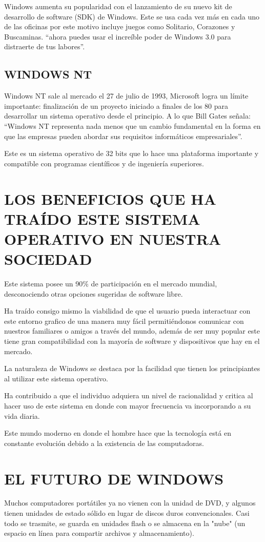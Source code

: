 Windows aumenta su popularidad con el lanzamiento de su nuevo kit de desarrollo de software (SDK) de Windows. Este se usa cada vez más en cada uno de las oficinas por este 
motivo incluye juegos como Solitario, Corazones y Buscaminas. “ahora puedes usar el increíble poder de Windows 3.0 para distraerte de tus labores”.

\subsection*{WINDOWS NT}
Windows NT sale al mercado el 27 de julio de 1993, Microsoft logra un límite importante: finalización de un proyecto iniciado a finales de los 80 para desarrollar un 
sistema operativo desde el principio. A lo que Bill Gates señala: “Windows NT representa nada menos que un cambio fundamental en la forma en que las empresas pueden abordar 
sus requisitos informáticos empresariales”.
 
Este es un sistema operativo de 32 bits que lo hace una plataforma importante y compatible con programas científicos y de ingeniería superiores.

\section*{LOS BENEFICIOS QUE HA TRAÍDO ESTE SISTEMA OPERATIVO EN NUESTRA SOCIEDAD}
Este sistema posee un 90\% de participación en el mercado mundial, desconociendo otras opciones sugeridas de software libre.

Ha traído consigo mismo la viabilidad de que el  usuario pueda interactuar con este entorno grafico de una manera muy fácil  permitiéndonos comunicar con nuestros 
familiares o amigos a través del mundo, además de ser muy popular este tiene gran compatibilidad con la mayoría de  software y dispositivos que hay en el mercado.

La naturaleza de Windows  se destaca por la facilidad que tienen los principiantes al utilizar este sistema operativo.

Ha contribuido a que el individuo adquiera un nivel de racionalidad y critica al hacer uso de este sistema en donde con mayor frecuencia va incorporando a su vida diaria.

Este mundo moderno en donde el hombre hace que la tecnología está en constante evolución debido a la existencia de las computadoras.

\section*{EL FUTURO DE WINDOWS}
Muchos computadores portátiles ya no vienen con la unidad de DVD, y algunos tienen unidades de estado sólido en lugar de discos duros convencionales. Casi todo se trasmite, 
se guarda en unidades flash o se almacena en la "nube" (un espacio en línea para compartir archivos y almacenamiento).


